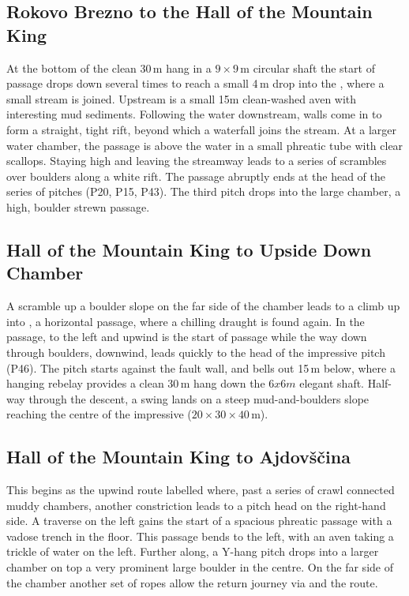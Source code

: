 \subsection{Rokovo Brezno to the Hall of the Mountain King}
 At the bottom of the clean 30\,m hang in a $9\times9$\,m circular shaft the start of  passage drops down several times to reach a small 4\,m drop into the , where a small stream is joined. Upstream is a small 15m clean-washed aven with interesting mud sediments. Following the water downstream, walls come in to form a straight, tight rift, beyond which a waterfall joins the stream. At a larger water chamber, the passage is above the water in a small phreatic tube with clear scallops. Staying high and leaving the streamway leads to a series of scrambles over boulders along a white rift. The passage abruptly ends at the head of the  series of pitches (P20, P15, P43). The third pitch drops into the large  chamber, a high, boulder strewn passage.

\subsection{Hall of the Mountain King to Upside Down Chamber}
A scramble up a boulder slope on the far side of the chamber leads to a climb up into , a horizontal passage, where a chilling draught is found again. In the passage, to the left and upwind is the start of  passage while the way down through boulders, downwind, leads quickly to the head of the impressive  pitch (P46). The pitch starts against the fault wall, and bells out 15\,m below, where a hanging rebelay provides a clean 30\,m hang down the $6x6m$ elegant shaft. Half-way through the descent, a swing lands on a steep mud-and-boulders slope reaching the centre of the impressive  ($20\times30\times40$\,m).

\subsection{Hall of the Mountain King to Ajdov\v{s}\v{c}ina}
This begins as the upwind route labelled  where, past a series of crawl connected muddy chambers, another constriction leads to a pitch head on the right-hand side. A traverse on the left gains the start of  a spacious phreatic passage with a vadose trench in the floor. This passage bends to the left, with an aven taking a trickle of water on the left. Further along, a Y-hang pitch drops into a larger chamber on top a very prominent large boulder in the centre. On the far side of the chamber another set of ropes allow the return journey via  and the  route.

